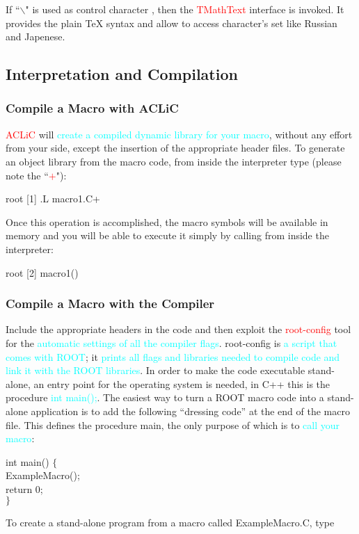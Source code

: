 \documentclass[12pt,a4paper]{article}
\begin{document}
If ``$\backslash$" is used as control character , then the \textcolor{red}{TMathText} interface is invoked. It provides the plain TeX syntax and allow to access character’s set like Russian and Japenese.


\subsection{Interpretation and Compilation}

\subsubsection{Compile a Macro with ACLiC}
\textcolor{red}{ACLiC} will \textcolor{cyan}{create a compiled dynamic library for your macro}, without any effort from your side, except the insertion of the appropriate header files. To generate an object library from the macro code, from inside the interpreter type (please note the ``\textcolor{red}{$+$}"):

root [1] .L macro1.C+

Once this operation is accomplished, the macro symbols will be available in memory and you will be able to execute it simply by calling from inside the interpreter:

root [2] macro1()

\subsubsection{Compile a Macro with the Compiler}
Include the appropriate headers in the code and then exploit the \textcolor{red}{root-config} tool for the \textcolor{cyan}{automatic settings of all the compiler flags}. root-config is \textcolor{cyan}{a script that comes with ROOT}; it \textcolor{cyan}{prints all flags and libraries needed to compile code and link it with the ROOT libraries}. In order to make the code executable stand-alone, an entry point for the operating system is needed, in C++ this is the procedure \textcolor{cyan}{int main();}. The easiest way to turn a ROOT macro code into a stand-alone application is to add the following “dressing code” at the end of the macro file. This defines the procedure main, the only purpose of which is to \textcolor{cyan}{call your macro}:

int main() $\{$ \\
ExampleMacro(); \\
return 0; \\
$\}$

To create a stand-alone program from a macro called ExampleMacro.C, type
\end{document}
